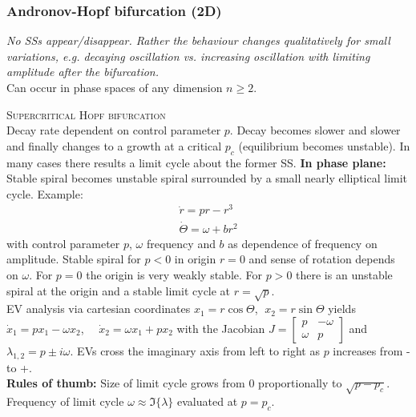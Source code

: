 \subsubsection{Andronov-Hopf bifurcation (2D)}
\emph{No SSs appear/disappear. Rather the behaviour changes qualitatively for small variations, e.g. decaying oscillation vs. increasing oscillation with limiting amplitude after the bifurcation.}\\
Can occur in phase spaces of any dimension $n\geq 2$.

\textsc{Supercritical Hopf bifurcation}\\
Decay rate dependent on control parameter $p$. Decay becomes slower and slower and finally changes to a growth at a critical $p_c$ (equilibrium becomes unstable). In many cases there results a limit cycle about the former SS. \textbf{In phase plane:} Stable spiral becomes unstable spiral surrounded by a small nearly elliptical limit cycle.
Example:
\begin{align*}
\dot{r}=pr-r^3\\
\dot{\Theta}=\omega+br^2
\end{align*}
with control parameter $p$, $\omega$ frequency and $b$ as dependence of frequency on amplitude. Stable spiral for $p<0$ in origin $r=0$ and sense of rotation depends on $\omega$. For $p=0$ the origin is very weakly stable. For $p>0$ there is an unstable spiral at the origin and a stable limit cycle at $r=\sqrt{p}$.\\
EV analysis via cartesian coordinates $x_1=r\cos \Theta$, $\;x_2=r\sin \Theta$ yields $\dot{x}_1 = px_1-\omega x_2$, $\quad\dot{x}_2 = \omega x_1+p x_2$ with the Jacobian $J=\begin{bmatrix}
p & -\omega \\ \omega & p
\end{bmatrix}$ and $\lambda_{1,2} = p \pm i\omega$. EVs cross the imaginary axis from left to right as $p$ increases from - to +. \\
\textbf{Rules of thumb:} Size of limit cycle grows from 0 proportionally to $\sqrt{p-p_c}$. Frequency of limit cycle $\omega \approx \Im \{\lambda\}$ evaluated at $p=p_c$.
\begin{center}
\end{center}
\vspace{0.2cm}


